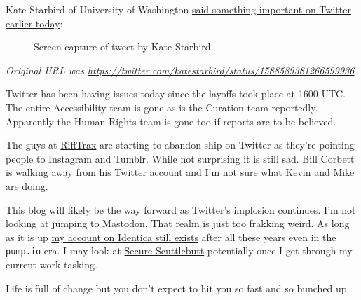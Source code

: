 Kate Starbird of University of Washington
\href{https://web.archive.org/web/20221104213000/https://twitter.com/katestarbird/status/1588589381266599936}{said
something important on Twitter earlier today}:

\begin{figure}
\centering
{}
\caption{Screen capture of tweet by Kate Starbird}
\end{figure}

\emph{Original URL was
\url{https://twitter.com/katestarbird/status/1588589381266599936}}

Twitter has been having issues today since the layoffs took place at
1600 UTC. The entire Accessibility team is gone as is the Curation team
reportedly. Apparently the Human Rights team is gone too if reports are
to be believed.

The guys at \href{https://rifftrax.com/}{RiffTrax} are starting to
abandon ship on Twitter as they're pointing people to Instagram and
Tumblr. While not surprising it is still sad. Bill Corbett is walking
away from his Twitter account and I'm not sure what Kevin and Mike are
doing.

This blog will likely be the way forward as Twitter's implosion
continues. I'm not looking at jumping to Mastodon. That realm is just
too frakking weird. As long as it is up
\href{https://identi.ca/alpacaherder}{my account on Identica still
exists} after all these years even in the \texttt{pump.io} era. I may
look at
\href{https://en.wikipedia.org/w/index.php?title=Secure_Scuttlebutt&oldid=1116253870}{Secure
Scuttlebutt} potentially once I get through my current work tasking.

Life is full of change but you don't expect to hit you so fast and so
bunched up.

